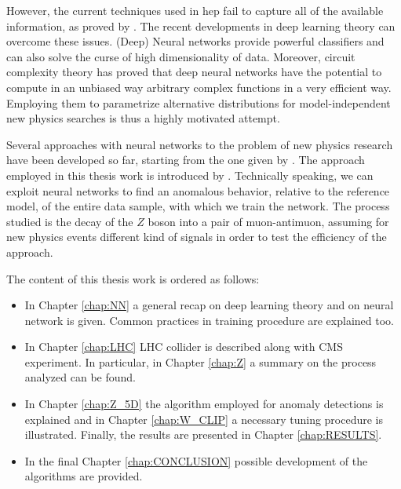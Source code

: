 However, the current techniques used in hep fail to capture all of the available information, as proved by \cite{baldi}. The recent developments in deep learning theory can overcome these issues. (Deep) Neural networks provide powerful classifiers and can also solve the curse of high dimensionality of data. Moreover, circuit complexity theory has proved that deep neural networks have the potential to compute in an unbiased way arbitrary complex functions in a very efficient way. Employing them to parametrize alternative distributions for model-independent new physics searches is thus a highly motivated attempt.

Several approaches with neural networks to the problem of new physics research have been developed so far, starting from the one given by \cite{baldi}. The approach employed in this thesis work is introduced by \cite{wulzer}. Technically speaking, we can exploit neural networks to find an anomalous behavior, relative to the reference model, of the entire data sample, with which we train the network. The process studied is the decay of the $Z$ boson into a pair of muon-antimuon, assuming for new physics events different kind of signals in order to test the efficiency of the approach.

\vspace{5mm}
\noindent
The content of this thesis work is ordered as follows:
\begin{itemize}
	\item In Chapter \ref{chap:NN} a general recap on deep learning theory and on neural network is given. Common practices in training procedure are explained too.
	\item In Chapter \ref{chap:LHC} LHC collider is described along with CMS experiment. In particular, in Chapter \ref{chap:Z} a summary on the process analyzed can be found.
	\item In Chapter \ref{chap:Z_5D} the algorithm employed for anomaly detections is explained and in Chapter \ref{chap:W_CLIP} a necessary tuning procedure is illustrated. Finally, the results are presented in Chapter \ref{chap:RESULTS}.
	\item In the final Chapter \ref{chap:CONCLUSION} possible development of the algorithms are provided.
\end{itemize}